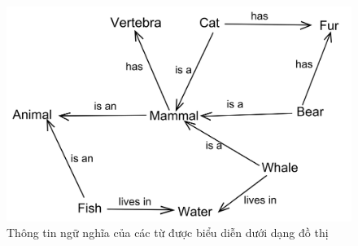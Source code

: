 \begin{itemize}
    \begin{figure}[H]
        \begin{center}
            \includegraphics[scale=0.2]{images/semantic-context}
            \caption{Thông tin ngữ nghĩa của các từ được biểu diễn dưới dạng đồ thị}
            \label{fig:semantic-context}
        \end{center}
    \end{figure}

\end{itemize}